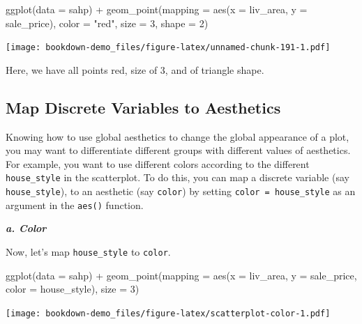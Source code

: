 \documentclass[
]{book}
\newenvironment{Shaded}{\begin{snugshade}}{\end{snugshade}}
\newcommand{\AttributeTok}[1]{\textcolor[rgb]{0.77,0.63,0.00}{#1}}
\newcommand{\DecValTok}[1]{\textcolor[rgb]{0.00,0.00,0.81}{#1}}
\newcommand{\FunctionTok}[1]{\textcolor[rgb]{0.00,0.00,0.00}{#1}}
\newcommand{\NormalTok}[1]{#1}
\newcommand{\SpecialCharTok}[1]{\textcolor[rgb]{0.00,0.00,0.00}{#1}}
\newcommand{\StringTok}[1]{\textcolor[rgb]{0.31,0.60,0.02}{#1}}
\begin{document}
\begin{Shaded}
\begin{Highlighting}[]
\FunctionTok{ggplot}\NormalTok{(}\AttributeTok{data =}\NormalTok{ sahp) }\SpecialCharTok{+} \FunctionTok{geom\_point}\NormalTok{(}\AttributeTok{mapping =} \FunctionTok{aes}\NormalTok{(}\AttributeTok{x =}\NormalTok{ liv\_area, }\AttributeTok{y =}\NormalTok{ sale\_price), }\AttributeTok{color =} \StringTok{"red"}\NormalTok{, }\AttributeTok{size =} \DecValTok{3}\NormalTok{, }\AttributeTok{shape =} \DecValTok{2}\NormalTok{)}
\end{Highlighting}
\end{Shaded}

\texttt{[image: bookdown-demo\_files/figure-latex/unnamed-chunk-191-1.pdf]}

Here, we have all points red, size of 3, and of triangle shape.

\hypertarget{map-discrete-aes}{%
\subsection{Map Discrete Variables to Aesthetics}\label{map-discrete-aes}}

Knowing how to use global aesthetics to change the global appearance of a plot, you may want to differentiate different groups with different values of aesthetics. For example, you want to use different colors according to the different \texttt{house\_style} in the scatterplot. To do this, you can map a discrete variable (say \texttt{house\_style}), to an aesthetic (say \texttt{color}) by setting \texttt{color\ =\ house\_style} as an argument in the \texttt{aes()} function.

\textbf{\emph{a. Color}}

Now, let's map \texttt{house\_style} to \texttt{color}.

\begin{Shaded}
\begin{Highlighting}[]
\FunctionTok{ggplot}\NormalTok{(}\AttributeTok{data =}\NormalTok{ sahp) }\SpecialCharTok{+} \FunctionTok{geom\_point}\NormalTok{(}\AttributeTok{mapping =} \FunctionTok{aes}\NormalTok{(}\AttributeTok{x =}\NormalTok{ liv\_area, }\AttributeTok{y =}\NormalTok{ sale\_price, }\AttributeTok{color =}\NormalTok{ house\_style), }\AttributeTok{size =} \DecValTok{3}\NormalTok{)}
\end{Highlighting}
\end{Shaded}

\texttt{[image: bookdown-demo\_files/figure-latex/scatterplot-color-1.pdf]}
\end{document}
